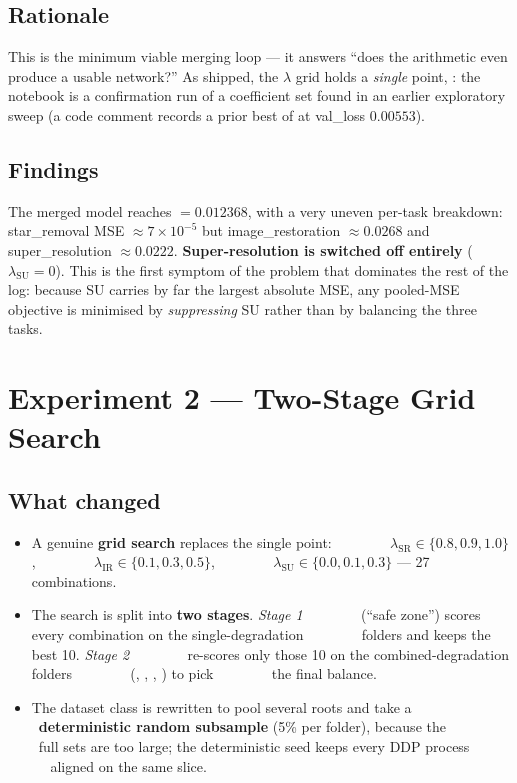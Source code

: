 \subsection*{Rationale}
This is the minimum viable merging loop --- it answers ``does the arithmetic
even produce a usable network?'' As shipped, the $\lambda$ grid holds a
\emph{single} point, : the notebook is a confirmation run of a
coefficient set found in an earlier exploratory sweep (a code comment records a
prior best of  at val\_loss $0.00553$).

\subsection*{Findings}
The merged model reaches  $=0.012368$, with a very uneven
per-task breakdown: star\_removal MSE $\approx 7\times10^{-5}$ but
image\_restoration $\approx 0.0268$ and super\_resolution $\approx 0.0222$.
\textbf{Super-resolution is switched off entirely} ($\lambda_{\mathrm{SU}}=0$).
This is the first symptom of the problem that dominates the rest of the log:
because SU carries by far the largest absolute MSE, any pooled-MSE objective is
minimised by \emph{suppressing} SU rather than by balancing the three tasks.

\section{Experiment 2 --- Two-Stage Grid Search}

\subsection*{What changed}
\begin{itemize}[nosep,leftmargin=1.4em]
   \item A genuine \textbf{grid search} replaces the single point:
         $\lambda_{\mathrm{SR}}\in\{0.8,0.9,1.0\}$,
         $\lambda_{\mathrm{IR}}\in\{0.1,0.3,0.5\}$,
         $\lambda_{\mathrm{SU}}\in\{0.0,0.1,0.3\}$ --- 27 combinations.
   \item The search is split into \textbf{two stages}. \emph{Stage 1}
         (``safe zone'') scores every combination on the single-degradation
         folders  and keeps the best 10. \emph{Stage 2}
         re-scores only those 10 on the combined-degradation folders
         (, , , ) to pick
         the final balance.
   \item The dataset class is rewritten to pool several roots and take a
         \textbf{deterministic random subsample} (5\% per folder), because the
         full sets are too large; the deterministic seed keeps every DDP process
         aligned on the same slice.
\end{itemize}

